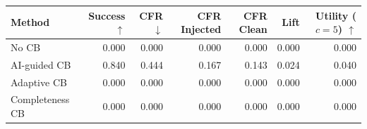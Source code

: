 \begin{tabular}{lrrrrrr}
\toprule
Method & Success $\uparrow$ & CFR $\downarrow$ & CFR Injected & CFR Clean & Lift & Utility ($c=5$) $\uparrow$ \\
\midrule
No CB & 0.000 & 0.000 & 0.000 & 0.000 & 0.000 & 0.000 \\
AI-guided CB & 0.840 & 0.444 & 0.167 & 0.143 & 0.024 & 0.040 \\
Adaptive CB & 0.000 & 0.000 & 0.000 & 0.000 & 0.000 & 0.000 \\
Completeness CB & 0.000 & 0.000 & 0.000 & 0.000 & 0.000 & 0.000 \\
\bottomrule
\end{tabular}
